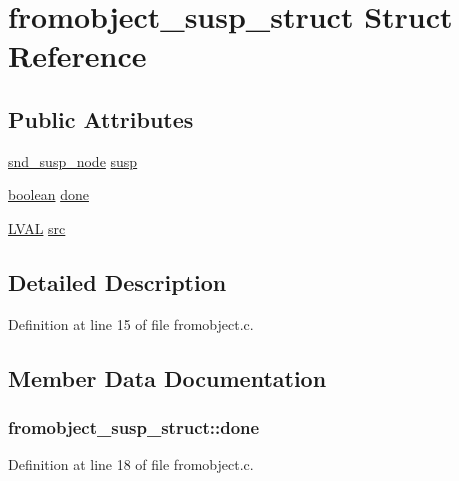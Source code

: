 \hypertarget{structfromobject__susp__struct}{}\section{fromobject\+\_\+susp\+\_\+struct Struct Reference}
\label{structfromobject__susp__struct}
\subsection*{Public Attributes}
\begin{DoxyCompactItemize}
\item 
\hyperlink{sound_8h_a6b268203688a934bd798ceb55f85d4c0}{snd\+\_\+susp\+\_\+node} \hyperlink{structfromobject__susp__struct_a1227c317cad4a4c492c5c8abd7b47a92}{susp}
\item 
\hyperlink{cext_8h_a7670a4e8a07d9ebb00411948b0bbf86d}{boolean} \hyperlink{structfromobject__susp__struct_a420c4ead92ddf7fc91049bb91b067cba}{done}
\item 
\hyperlink{xldmem_8h_a9a9ec6a5fbca2b40ed8d19faa799be8c}{L\+V\+AL} \hyperlink{structfromobject__susp__struct_a53e21196401f6758aef9adccdc7eb9f0}{src}
\end{DoxyCompactItemize}


\subsection{Detailed Description}


Definition at line 15 of file fromobject.\+c.



\subsection{Member Data Documentation}
\subsubsection[{\texorpdfstring{done}{done}}]{ fromobject\+\_\+susp\+\_\+struct\+::done}\hypertarget{structfromobject__susp__struct_a420c4ead92ddf7fc91049bb91b067cba}{}\label{structfromobject__susp__struct_a420c4ead92ddf7fc91049bb91b067cba}


Definition at line 18 of file fromobject.\+c.

